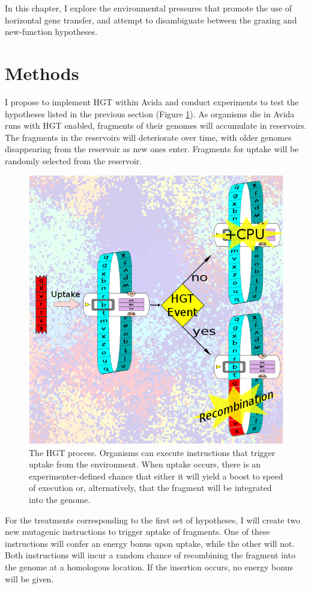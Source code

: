 \documentclass[PhD]{msu-thesis}
\begin{document}
In this chapter, I explore the environmental pressures that promote the use of horizontal gene transfer, and attempt to disambiguate between the grazing and new-function hypotheses.

\section{Methods}
I propose to implement HGT within Avida and conduct experiments to test the hypotheses listed in the previous section (Figure \ref{fig:hgtprocess}). As organisms die in Avida runs with HGT enabled, fragments of their genomes will accumulate in reservoirs. The fragments in the reservoirs will deteriorate over time, with older genomes disappearing from the reservoir as new ones enter. Fragments for uptake will be randomly selected from the reservoir. 

\begin{figure}[h!]
\begin{center}
\includegraphics[width=0.7\columnwidth]{figures/HGT/Figure.png}
\caption{The HGT process. Organisms can execute instructions that trigger uptake from the environment. When uptake occurs, there is an experimenter-defined chance that either it will yield a boost to speed of execution or, alternatively, that the fragment will be integrated into the genome.
}\label{fig:hgtprocess}
\end{center}
\end{figure}

For the treatments corresponding to the first set of hypotheses, I will create two new mutagenic instructions to trigger uptake of fragments. One of these instructions will confer an energy bonus upon uptake, while the other will not. Both instructions will incur a random chance of recombining the fragment into the genome at a homologous location. %
If the insertion occurs, no energy bonus will be given. 
\end{document}
